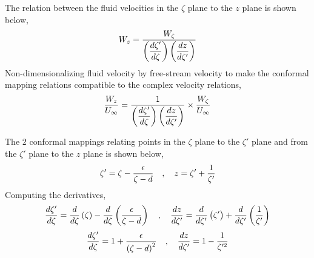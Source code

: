 \documentclass[class=report, 12pt, crop=false]{standalone}
\begin{document}
\begin{center}
The relation between the fluid velocities in the $\zeta$ plane to the $z$ plane is shown below,
$$W_z = \frac{W_{\zeta}}{\displaystyle{\left(\frac{d\zeta'}{d\zeta}\right)\left(\frac{dz}{d\zeta'}\right)}}$$
Non-dimensionalizing fluid velocity by free-stream velocity to make the conformal mapping relations compatible to the complex velocity relations,
$$\frac{W_z}{U_\infty} = \frac{1}{\displaystyle{\left(\frac{d\zeta'}{d\zeta}\right)\left(\frac{dz}{d\zeta'}\right)}}\times\frac{W_{\zeta}}{U_\infty}$$


The $2$ conformal mappings relating points in the $\zeta$ plane to the $\zeta'$ plane and from the $\zeta'$ plane to the $z$ plane is shown below,
$$\zeta' = \zeta - \frac{\epsilon}{\zeta-d} \quad,\quad z = \zeta' + \frac{1}{\zeta'}$$
Computing the derivatives,
$$\frac{d\zeta'}{d\zeta} = \frac{d}{d\zeta}\left(\zeta\right) - \frac{d}{d\zeta}\left(\frac{\epsilon}{\zeta-d}\right) \quad,\quad \frac{dz}{d\zeta'} = \frac{d}{d\zeta'}\left(\zeta'\right) + \frac{d}{d\zeta'}\left(\frac{1}{\zeta'}\right)$$
$$\frac{d\zeta'}{d\zeta} = 1 + \frac{\epsilon}{\left(\zeta-d\right)^2} \quad,\quad \frac{dz}{d\zeta'} = 1 - \frac{1}{\zeta'^2}$$




   

     










\end{center}
\end{document}
